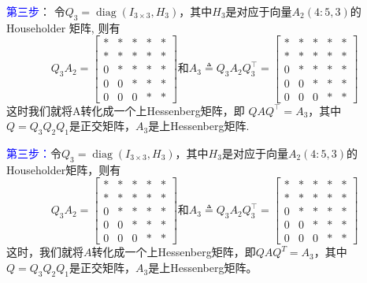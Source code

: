 \documentclass[12pt,a4paper]{article}
\begin{document}
	\textcolor{blue}{第三步}：
	令$Q_{3}=\operatorname{diag}\left(I_{3 \times 3}, H_{3}\right)$，其中$H_{3}$是对应于向量$A_{2}(4 : 5,3)$的Householder 矩阵, 则有
	$$
	Q_{3} A_{2}=\left[\begin{array}{ccccc}
	* &*& *& *&* \\ 
	* &*& *& *&* \\ 
	0 &*& *& *&*\\ 
	0 &0& *& *&*\\ 
	0 &0& 0& *&*
	\end{array}\right]和A_{3} \triangleq Q_{3} A_{2} Q_{3}^{\top}=\left[\begin{array}{ccccc}
	* &*& *& *&* \\ 
	* &*& *& *&* \\ 
	0 &*& *& *&*\\ 
	0 &0& *& *&*\\ 
	0 &0& 0& *&*
	\end{array}\right]
	$$
	这时我们就将A转化成一个上Hessenberg矩阵，即
	$Q A Q^{\top}=A_{3}$，其中$Q=Q_{3} Q_{2} Q_{1}$是正交矩阵，$A_{3}$是上Hessenberg矩阵.

\textcolor{blue}{第三步：}\quad 令$Q_{3}=\operatorname{diag}\left(I_{3 \times 3}, H_{3}\right)$，其中$H_3$是对应于向量$A_2(4:5,3)$的Householder矩阵，则有$$
Q_{3} A_{2}=\left[\begin{array}{ccccc}{*} & {*} &{*} &{*} & {*} \\ {*} & {*} &{*} &{*} & {*} \\ {0} & {*} &{*} & {*} &{*} \\ {0} & {0} & {*} &{*} & {*} \\ {0} & {0} & {0} & {*} &{*}\end{array}\right]
\text{和} A_{3} \triangleq Q_{3} A_{2} Q_{3}^{\top}=\left[\begin{array}{ccccc}{*} & {*} &{*} &{*} & {*} \\ {*} & {*} &{*} &{*} & {*} \\ {0} & {*} &{*} &{*} & {*} \\  {0} & {0} & {*} &{*} & {*} \\ {0} & {0} & {0} &{*} & {*}\end{array}\right]
$$
这时，我们就将$A$转化成一个上Hessenberg矩阵，即$QAQ^T=A_3$，其中$Q=Q_3Q_2Q_1$是正交矩阵，$A_3$是上Hessenberg矩阵。
\end{document}
